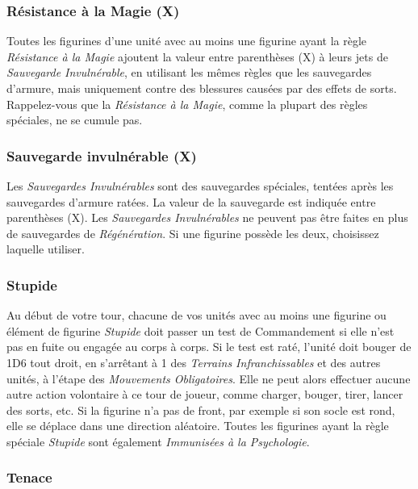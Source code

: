 \subsubsection*{Résistance à la Magie (X)}

Toutes les figurines d'une unité avec au moins une figurine ayant la règle \emph{Résistance à la Magie} ajoutent la valeur entre parenthèses (X) à leurs jets de \emph{Sauvegarde Invulnérable}, en utilisant les mêmes règles que les sauvegardes d'armure, mais uniquement contre des blessures causées par des effets de sorts. Rappelez-vous que la \emph{Résistance à la Magie}, comme la plupart des règles spéciales, ne se cumule pas.

\subsubsection*{Sauvegarde invulnérable (X)}

Les \emph{Sauvegardes Invulnérables} sont des sauvegardes spéciales, tentées après les sauvegardes d'armure ratées. La valeur de la sauvegarde est indiquée entre parenthèses (X). Les \emph{Sauvegardes Invulnérables} ne peuvent pas être faites en plus de sauvegardes de \emph{Régénération}. Si une figurine possède les deux, choisissez laquelle utiliser.

\subsubsection*{Stupide}

Au début de votre tour, chacune de vos unités avec au moins une figurine ou élément de figurine \emph{Stupide} doit passer un test de Commandement si elle n'est pas en fuite ou engagée au corps à corps. Si le test est raté, l'unité doit bouger de \unit{1D6}{\pouce} tout droit, en s'arrêtant à \unit{1}{\pouce} des \emph{Terrains Infranchissables} et des autres unités, à l'étape des \emph{Mouvements Obligatoires}. Elle ne peut alors effectuer aucune autre action volontaire à ce tour de joueur, comme charger, bouger, tirer, lancer des sorts, etc. Si la figurine n'a pas de front, par exemple si son socle est rond, elle se déplace dans une direction aléatoire. Toutes les figurines ayant la règle spéciale \emph{Stupide} sont également \emph{Immunisées à la Psychologie}.

\subsubsection*{Tenace}

